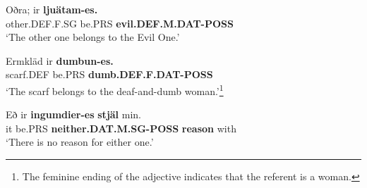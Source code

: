 \item 


 \ea\label{}
\gll Oðra;  ir  \textbf{ljuätam-es.}\\


other.DEF.F.SG  be.PRS  \textbf{evil.DEF.M.DAT-POSS}\\

\glt ‘The other one belongs to the Evil One.’

\z

\item 


 \ea\label{}
\gll Ermkläd  ir  \textbf{dumbun-es.}\\


scarf.DEF  be.PRS  \textbf{dumb.DEF.F.DAT-POSS}\\

\glt ‘The scarf belongs to the deaf-and-dumb woman.’\footnote{ The feminine ending of the adjective indicates that the referent is a woman.}

\z

\item 


 \ea\label{}
\gll Eð  ir  \textbf{ingumdier-es}\textbf{  stjäl} min.  \\


it  be.PRS  \textbf{neither.DAT.M.SG-POSS} \textbf{reason} with  \\

\glt ‘There is no reason for either one.’

\z

